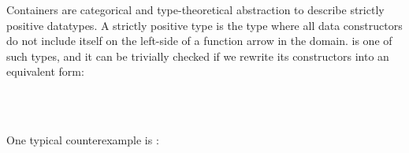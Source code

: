 Containers are categorical and type-theoretical abstraction to describe strictly positive datatypes. A strictly positive type is the type where all data constructors do not include itself on the left-side of a function arrow in the domain.  is one of such types, and it can be trivially checked if we rewrite its constructors into an equivalent form:

\begin{code}%
\>[0]\AgdaSpace{}%
\AgdaSpace{}%
\AgdaSymbol{:}\AgdaSpace{}%
\AgdaSpace{}%
\<%
\\
\>[0][@{}l@{\AgdaIndent{0}}]%
\>[2]\AgdaSpace{}%
\AgdaSymbol{:}\AgdaSpace{}%
\AgdaSymbol{(}\AgdaSpace{}%
\AgdaSpace{}%
\AgdaSymbol{)}\AgdaSpace{}%
\AgdaSpace{}%
\<%
\\
%
\>[2]\AgdaSpace{}%
\AgdaSymbol{:}\AgdaSpace{}%
\AgdaSymbol{(}\AgdaSpace{}%
\AgdaSpace{}%
\AgdaSymbol{)}\AgdaSpace{}%
\AgdaSpace{}%
\<%
\end{code}

One typical counterexample is :

\begin{code}%
\>[0]\AgdaSymbol{\{-\#}\AgdaSpace{}%
\AgdaSpace{}%
\AgdaSymbol{\#-\}}\<%
\\
\>[0]\AgdaSpace{}%
\AgdaSpace{}%
\AgdaSymbol{:}\AgdaSpace{}%
\AgdaSpace{}%
\<%
\\
\>[0][@{}l@{\AgdaIndent{0}}]%
\>[2]\AgdaSpace{}%
\AgdaSymbol{:}\AgdaSpace{}%
\AgdaSymbol{(}\AgdaSpace{}%
\AgdaSpace{}%
\AgdaSymbol{)}\AgdaSpace{}%
\AgdaSpace{}%
\<%
\\
%
\\[\AgdaEmptyExtraSkip]%
\>[0]\AgdaSpace{}%
\AgdaSymbol{:}\AgdaSpace{}%
\AgdaSpace{}%
\AgdaSpace{}%
\<%
\\
\>[0]\AgdaSpace{}%
\AgdaSymbol{(}\AgdaSpace{}%
\AgdaSymbol{)}\AgdaSpace{}%
\AgdaSymbol{=}\AgdaSpace{}%
\AgdaSpace{}%
\AgdaSymbol{(}\AgdaSpace{}%
\AgdaSymbol{)}\<%
\\
%
\\[\AgdaEmptyExtraSkip]%
\>[0]\AgdaSpace{}%
\AgdaSymbol{:}\AgdaSpace{}%
\<%
\\
\>[0]\AgdaSpace{}%
\AgdaSymbol{=}\AgdaSpace{}%
\AgdaSpace{}%
\AgdaSymbol{(}\AgdaSpace{}%
\AgdaSymbol{)}\<%
\end{code}

